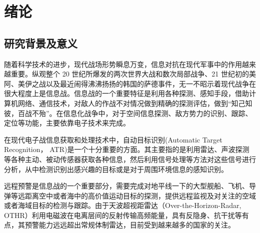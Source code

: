 \chapter{绪论}
\section{研究背景及意义}






随着科学技术的进步，现代战场形势瞬息万变，信息对抗在现代军事中的作用越来越重要。纵观整个 20 世纪所爆发的两次世界大战和数次局部战争、21 世纪初的美阿、美伊之战以及最近闹得沸沸扬扬的韩国的萨德事件，无一不昭示着现代战争在很大程度上是信息战。信息战的一个重要特征是利用各种探测、感知手段，借助计算机网络、通信技术，对敌人的作战不对情况做到精确的探测评估，做到“知己知彼，百战不殆”。在信息化战争中，对于空间信息探测、敌方势力的识别、跟踪、定位等功能，主要依靠电子技术来完成\cite{顾耀平2006电子战发展趋势分析, 孙德海2003国外电子战发展综述及对我国电子战研究的思考, 炜森1996综合电子战新技术新方法, 孙纪尧2014电子战}。

在现代电子战信息获取和处理技术中，自动目标识别(Automatic Target Recognition， ATR)是一个十分重要的方面。其主要指的是利用雷达、声波探测等各种主动、被动传感器获取各种信息，然后利用信号处理等方法对这些信号进行分析，从中检测识别出感兴趣的目标或是对于周围环境信息的感知识别。

远程预警是信息战的一个重要部分，需要完成对地平线一下的大型舰船、飞机、导弹等远距离空中或者海中的高价值运动目标的探测，提供远程监视及对关注的空域或者海域目标的检测与跟踪。由于天波超视距雷达（Over-the-Horizon-Radar, OTHR）利用电磁波在电离层间的反射传输高频能量，具有反隐身、抗干扰等有点，其预警能力远远超出常规体制雷达，目前受到越来越多的国家的关注。


